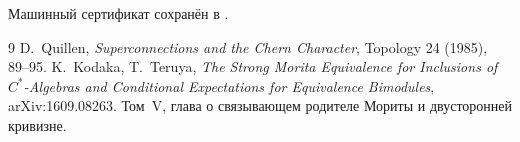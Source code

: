 Машинный сертификат сохранён в
.

\begin{thebibliography}{9}
D.~Quillen,
\emph{Superconnections and the Chern Character},
Topology 24 (1985), 89--95.
K.~Kodaka, T.~Teruya,
\emph{The Strong Morita Equivalence for Inclusions of $C^*$-Algebras and
Conditional Expectations for Equivalence Bimodules},
arXiv:1609.08263.
Том~V, глава о связывающем родителе Мориты и двусторонней кривизне.
\end{thebibliography}